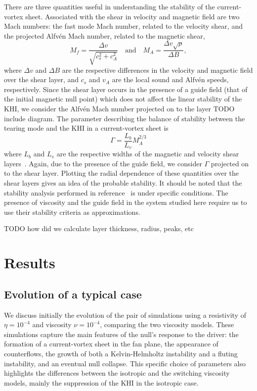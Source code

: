 There are three quantities useful in understanding the stability of the current-vortex sheet. Associated with the shear in velocity and magnetic field are two Mach numbers: the fast mode Mach number, related to the velocity shear, and the projected Alfv\'en Mach number, related to the magnetic shear,
\begin{equation}
  \label{eq:mach_numbers}
  M_f = \frac{\Delta v}{\sqrt{c_s^2 + c_A^2}} \quad \text{and} \quad M_A = \frac{\Delta v \sqrt{\rho}}{\Delta B},
\end{equation}
where $\Delta v$ and $\Delta B$ are the respective differences in the velocity and magnetic field over the shear layer, and $c_s$ and $v_A$ are the local sound and Alfv\'en speeds, respectively. Since the shear layer occurs in the presence of a guide field (that of the initial magnetic null point) which does not affect the linear stability of the KHI, we consider the Alfv\'en Mach number projected on to the layer TODO include diagram. The parameter describing the balance of stability between the tearing mode and the KHI in a current-vortex sheet is
\begin{equation}
  \label{eq:khi_stability_param}
  \Gamma = \frac{L_b}{L_v} M_A^{2/3}
\end{equation}
where $L_b$ and $L_v$ are the respective widths of the magnetic and velocity shear layers~\cite{einaudiResistiveInstabilitiesFlowing1986}. Again, due to the presence of the guide field, we consider $\Gamma$ projected on to the shear layer. Plotting the radial dependence of these quantities over the shear layers gives an idea of the probable stability. It should be noted that the stability analysis performed in reference~\cite{einaudiResistiveInstabilitiesFlowing1986} is under specific conditions. The presence of viscosity and the guide field in the system studied here require us to use their stability criteria as approximations.

TODO how did we calculate layer thickness, radius, peaks, etc

\section{Results}

\subsection{Evolution of a typical case}
\label{sec:null_point_khi_single_case}

We discuss initially the evolution of the pair of simulations using a resistivity of $\eta = 10^{-4}$ and viscosity $\nu = 10^{-4}$, comparing the two viscosity models. These simulations capture the main features of the null's response to the driver: the formation of a current-vortex sheet in the fan plane, the appearance of counterflows, the growth of both a Kelvin-Helmholtz instability and a fluting instability, and an eventual null collapse. This specific choice of parameters also highlights the differences between the isotropic and the switching viscosity models, mainly the suppression of the KHI in the isotropic case.

